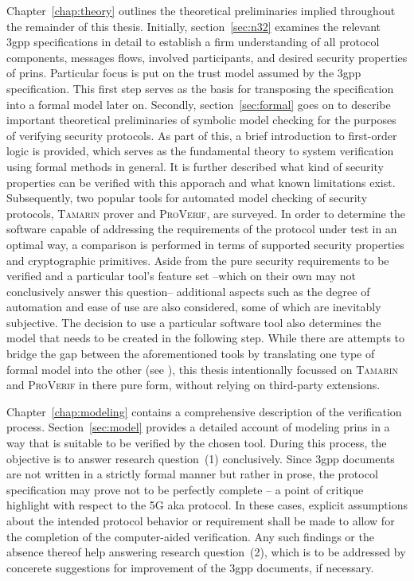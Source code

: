Chapter~\ref{chap:theory} outlines the theoretical preliminaries implied throughout the remainder of this thesis.
Initially, section~\ref{sec:n32} examines the relevant \gls{3gpp} specifications in detail to establish a firm understanding of all protocol components, messages flows, involved participants, and desired security properties of \gls{prins}.
Particular focus is put on the trust model assumed by the \gls{3gpp} specification.
This first step serves as the basis for transposing the specification into a formal model later on.
Secondly, section~\ref{sec:formal} goes on to describe important theoretical preliminaries of symbolic model checking for the purposes of verifying security protocols.
As part of this, a brief introduction to first-order logic is provided, which serves as the fundamental theory to system verification using formal methods in general.
It is further described what kind of security properties can be verified with this apporach and what known limitations exist.
Subsequently, two popular tools for automated model checking of security protocols, \textsc{Tamarin} prover and \textsc{ProVerif}, are surveyed.
In order to determine the software capable of addressing the requirements of the protocol under test in an optimal way, a comparison is performed in terms of supported security properties and cryptographic primitives.
Aside from the pure security requirements to be verified and a particular tool's feature set --which on their own may not conclusively answer this question-- additional aspects such as the degree of automation and ease of use are also considered, some of which are inevitably subjective.
The decision to use a particular software tool also determines the model that needs to be created in the following step.
While there are attempts to bridge the gap between the aforementioned tools by translating one type of formal model into the other (see \cite{kremer2016automated}), this thesis intentionally focussed on \textsc{Tamarin} and \textsc{ProVerif} in there pure form, without relying on third-party extensions.

Chapter~\ref{chap:modeling} contains a comprehensive description of the verification process.
Section~\ref{sec:model} provides a detailed account of modeling \gls{prins} in a way that is suitable to be verified by the chosen tool.
During this process, the objective is to answer research question~(1) conclusively.
Since \gls{3gpp} documents are not written in a strictly formal manner but rather in prose, the protocol specification may prove not to be perfectly complete -- a point of critique \cite{basin2018model} highlight with respect to the 5G \gls{aka} protocol.
In these cases, explicit assumptions about the intended protocol behavior or requirement shall be made to allow for the completion of the computer-aided verification.
Any such findings or the absence thereof help answering research question~(2), which is to be addressed by concerete suggestions for improvement of the \gls{3gpp} documents, if necessary.

